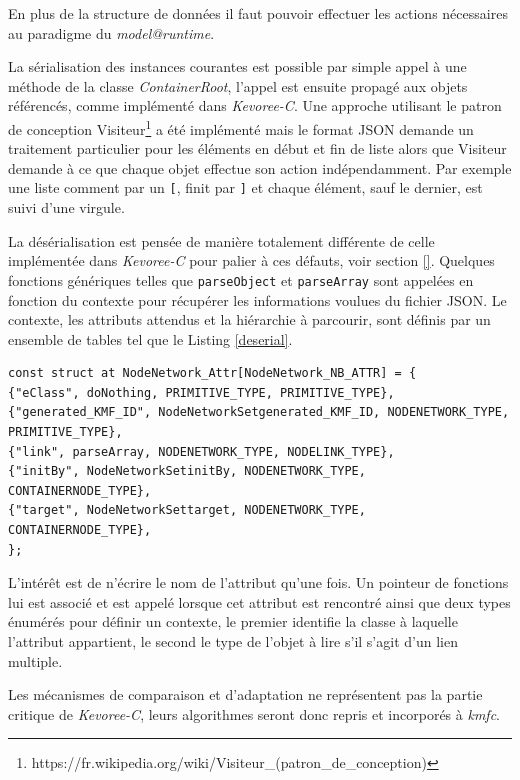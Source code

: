 En plus de la structure de données il faut pouvoir effectuer les actions nécessaires au paradigme du \emph{model@runtime}.

La sérialisation des instances courantes est possible par simple appel à une méthode de la classe \emph{ContainerRoot}, l'appel est ensuite propagé aux objets référencés, comme implémenté dans \emph{Kevoree-C}. Une approche utilisant le patron de conception Visiteur\footnote{https://fr.wikipedia.org/wiki/Visiteur\_(patron\_de\_conception)} a été implémenté mais le format JSON demande un traitement particulier pour les éléments en début et fin de liste alors que Visiteur demande à ce que chaque objet effectue son action indépendamment. Par exemple une liste comment par un \texttt{[}, finit par \texttt{]} et chaque élément, sauf le dernier, est suivi d'une virgule.

La désérialisation est pensée de manière totalement différente de celle implémentée dans \emph{Kevoree-C} pour palier à ces défauts, voir section \ref{}. Quelques fonctions génériques telles que \texttt{parseObject} et \texttt{parseArray} sont appelées en fonction du contexte pour récupérer les informations voulues du fichier JSON. Le contexte, les attributs attendus et la hiérarchie à parcourir, sont définis par un ensemble de tables tel que le Listing \ref{deserial}.


\begin{lstlisting}[frame=single, label={deserial}]
const struct at NodeNetwork_Attr[NodeNetwork_NB_ATTR] = {
{"eClass", doNothing, PRIMITIVE_TYPE, PRIMITIVE_TYPE},
{"generated_KMF_ID", NodeNetworkSetgenerated_KMF_ID, NODENETWORK_TYPE, PRIMITIVE_TYPE},
{"link", parseArray, NODENETWORK_TYPE, NODELINK_TYPE},
{"initBy", NodeNetworkSetinitBy, NODENETWORK_TYPE, CONTAINERNODE_TYPE},
{"target", NodeNetworkSettarget, NODENETWORK_TYPE, CONTAINERNODE_TYPE},
};
\end{lstlisting}

L'intérêt est de n'écrire le nom de l'attribut qu'une fois.
Un pointeur de fonctions lui est associé et est appelé lorsque cet attribut est rencontré ainsi que deux types énumérés pour définir un contexte, le premier identifie la classe à laquelle l'attribut appartient, le second le type de l'objet à lire s'il s'agit d'un lien multiple.

Les mécanismes de comparaison et d'adaptation ne représentent pas la partie critique de \emph{Kevoree-C}, leurs algorithmes seront donc repris et incorporés à \emph{kmfc}.

